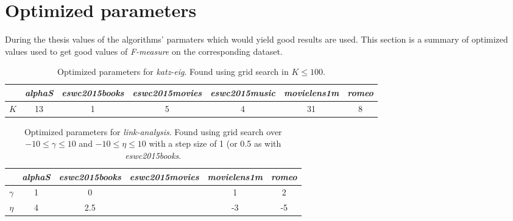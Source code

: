 
\chapter{Optimized parameters}\label{app:opt_params}

During the thesis values of the algorithms' parmaters which would yield good results are used. This section is a summary of optimized values used to get good values of \textit{F-measure} on the corresponding dataset.

\begin{table}[h!]
    \centering
    \begin{tabular}{| c | c | c | c | c | c | c |}
        \hline
        \textbf{}   & \textit{alphaS}   & \textit{eswc2015books} & \textit{eswc2015movies} & \textit{eswc2015music} & \textit{movielens1m}   & \textit{romeo} \\ \hline
        $K$         & 13                & 1                      & 5                       & 4                       & 31                     & 8              \\ \hline
    \end{tabular}
    \caption{Optimized parameters for \textit{katz-eig}. Found using grid search in $K \leq 100$.}
    \label{tab:katzeig_params_used}
\end{table}

\begin{table}[h!]
    \centering
    \begin{tabular}{| c | c | c | c | c | c | }
        \hline
        \textbf{}   & \textit{alphaS}   & \textit{eswc2015books} & \textit{eswc2015movies} & \textit{movielens1m}   & \textit{romeo} \\ \hline
        $\gamma$    & 1                 & 0                      &                         & 1                      & 2              \\ \hline
        $\eta$      & 4                 & 2.5                    &                         & -3                     & -5             \\ \hline
    \end{tabular}
    \caption{Optimized parameters for \textit{link-analysis}. Found using grid search over $-10 \leq \gamma \leq 10$ and $-10 \leq \eta \leq 10$ with a step size of 1 (or 0.5 as with \textit{eswc2015books}.}
    \label{tab:linkanalysis_params_used}
\end{table}


